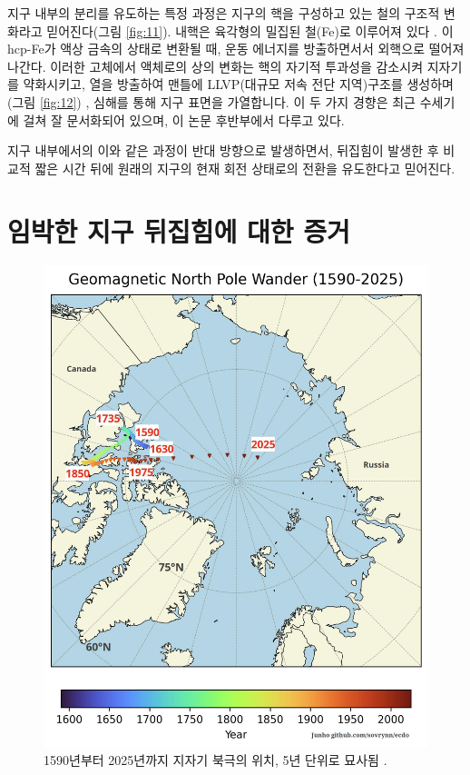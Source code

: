 \documentclass[10pt,twocolumn,letterpaper]{article}
\begin{document}
지구 내부의 분리를 유도하는 특정 과정은 지구의 핵을 구성하고 있는 철의 구조적 변화라고 믿어진다(그림 \ref{fig:11}). 내핵은 육각형의 밀집된 철(Fe)로 이루어져 있다 \cite{141}. 이 hcp-Fe가 액상 금속의  상태로 변환될 때,  운동 에너지를 방출하면서서 외핵으로 떨어져 나간다. 이러한 고체에서 액체로의 상의 변화는 핵의 자기적 투과성을 감소시켜 지자기를 약화시키고, 열을 방출하여 맨틀에 LLVP(대규모 저속 전단 지역)구조를 생성하며(그림 \ref{fig:12}) \cite{38}, 심해를 통해 지구 표면을 가열합니다. 이 두 가지 경향은 최근 수세기에 걸쳐 잘 문서화되어 있으며, 이 논문 후반부에서 다루고 있다.

지구 내부에서의 이와 같은 과정이 반대 방향으로 발생하면서, 뒤집힘이 발생한 후 비교적 짧은 시간 뒤에 원래의 지구의 현재 회전 상태로의 전환을 유도한다고 믿어진다.

\section{임박한 지구 뒤집힘에 대한 증거}

\begin{figure}[t]
\begin{center}
   \includegraphics[width=1\linewidth]{npw.jpg}
\end{center}
   \caption{1590년부터 2025년까지 지자기 북극의 위치, 5년 단위로 묘사됨 \cite{142}.}
\label{fig:13}
\label{fig:onecol}
\end{figure}
\end{document}
